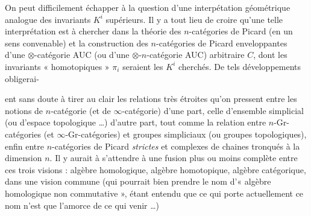 \documentclass[11pt,a4paper]{article}
\begin{document}
On peut difficilement échapper à la question d'une interpétation
géométrique analogue des invariants $K^i$ supérieurs. Il y a tout lieu de
croire qu'une telle interprétation est à chercher dans la théorie des
$n$-catégories de Picard (en un sens convenable) et la construction des
$n$-catégories de Picard enveloppantes d'une $\otimes$-catégorie AUC (ou
d'une $\otimes$-$n$-catégorie AUC) arbitraire $C$, dont les invariants
« homotopiques » $\pi_i$ seraient les $K^i$ cherchés. De tels
développements obligerai-



ent sans doute à tirer au clair les relations très étroites qu'on pressent
entre les notions de $n$-catégorie (et de $\infty$-catégorie) d'une part,
celle d'ensemble simplicial (ou d'espace topologique …) d'autre part, tout
comme la relation entre $n$-Gr-catégories (et $\infty$-Gr-catégories) et
groupes simpliciaux (ou groupes topologiques), enfin entre $n$-catégories de
Picard \emph{strictes} et complexes de chaines tronqués à la dimension $n$.
Il y aurait à s'attendre à une fusion plus ou moins complète entre ces trois
visions : algèbre homologique, algèbre homotopique, algèbre catégorique,
dans une vision commune (qui pourrait bien prendre le nom d'« algèbre
homologique non commutative », étant entendu que ce qui porte actuellement
ce nom n'est que l'amorce de ce qui   venir …)
\end{document}
